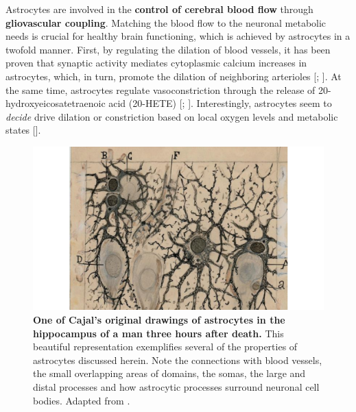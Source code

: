 Astrocytes are involved in the \textbf{control of cerebral blood flow} through \textbf{gliovascular coupling}.
Matching the blood flow to the neuronal metabolic needs is crucial for healthy brain functioning, which is achieved by astrocytes in a twofold manner. 
First, by regulating the dilation of blood vessels, it has been proven that synaptic activity mediates cytoplasmic calcium increases in astrocytes, which, in turn, promote the dilation of neighboring arterioles [\cite{zonta2003}; \cite{attwell2010}].
At the same time, astrocytes regulate vasoconstriction through the release of 20-hydroxyeicosatetraenoic acid (20-HETE) [\cite{metea2006}; \cite{attwell2010}].
Interestingly, astrocytes seem to \textit{decide} drive dilation or constriction based on local oxygen levels and metabolic states [\cite{macvicar2015}]. 
\begin{figure}
    \centering
    \includegraphics[width=\textwidth]{Figures/Chapter1/intro_fig_astro_cajal.pdf}
    \caption[Cajal's drawing of astrocytes]{\textbf{One of Cajal's original drawings of astrocytes in the hippocampus of a man three hours after death.} This beautiful representation exemplifies several of the properties of astrocytes discussed herein. Note the connections with blood vessels, the small overlapping areas of domains, the somas, the large and distal processes and how astrocytic processes surround neuronal cell bodies.
    Adapted from \cite{swanson2017beautiful}.}
    \label{fig:chap1:astro_anatomy_cajal}
\end{figure}

